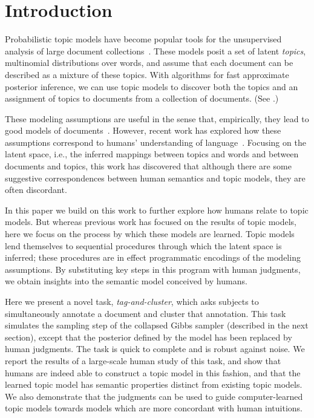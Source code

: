 \section{Introduction}
Probabilistic topic models have become popular tools for the
unsupervised analysis of large document
collections~\cite{deerwester-90,griffiths02probabilistic,blei-09}.
These models posit a set of latent \emph{topics}, multinomial
distributions over words, and assume that each document can be
described as a mixture of these topics.  With algorithms for fast
approximate posterior inference, we can use topic models to discover
both the topics and an assignment of topics to documents from a
collection of documents.  (See .)

These modeling assumptions are useful in the sense that, empirically,
they lead to good models of documents~\cite{wallach-09}.  However,
recent work has explored how these assumptions correspond to humans'
understanding of language~\cite{Chang:2009fk,griffiths-06,mei-07}.  Focusing
on the latent space, i.e., the inferred mappings between topics and
words and between documents and topics, this work has discovered that
although there are some suggestive correspondences between human
semantics and topic models, they are often discordant.

In this paper we build on this work to further explore how humans
relate to topic models.  But whereas previous work has focused on
the results of topic models, here we focus on the process by which
these models are learned.  Topic models lend themselves to sequential
procedures through which the latent space is inferred; these
procedures are in effect programmatic encodings of the modeling
assumptions.  By substituting key steps in this program with human
judgments, we obtain insights into the semantic model conceived by
humans.

Here we present a novel task, \emph{tag-and-cluster}, which asks
subjects to simultaneously annotate a document and cluster that
annotation.  This task simulates the sampling step of the collapsed
Gibbs sampler (described in the next section), except that the
posterior defined by the model has been replaced by human judgments.
The task is quick to complete and is robust against noise.  We report
the results of a large-scale human study of this task, and show that
humans are indeed able to construct a topic model in this fashion, and
that the learned topic model has semantic properties distinct from
existing topic models.  We also demonstrate that the judgments can be
used to guide computer-learned topic models towards models which are
more concordant with human intuitions.
